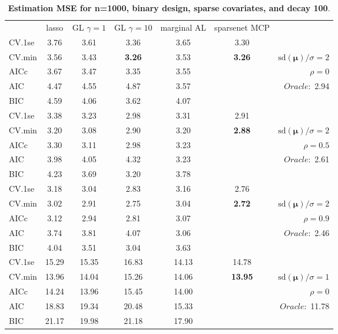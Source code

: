 \begin{table}\vspace{-.5cm}
\caption[l]{ { \bf Estimation MSE for n=1000, binary design, 
sparse covariates, and  decay  100}.}
\vspace{-.5cm}
\footnotesize{}
\begin{center}
\begin{tabular}{l*{5}{c}|r}
& lasso & GL $\gamma=1$ & GL $\gamma=10$ & marginal AL & sparsenet MCP  & \\
 \cline{1-7}
CV.1se & 3.76 & 3.61 & 3.36 & 3.65 & 3.30 & \\
CV.min & 3.56 & 3.43 & {\bf 3.26} & 3.53 & {\bf 3.26} &  $\mathrm{sd}(\mathbf{\mu})/\sigma=2$ \\
AICc & 3.67 & 3.47 & 3.35 & 3.55 & & $\rho=0$ \\
AIC & 4.47 & 4.55 & 4.87 & 3.57 & &  \multirow{2}{*}{$Oracle: $ 2.94} \\
BIC & 4.59 & 4.06 & 3.62 & 4.07 & &  \\
 \hline 
CV.1se & 3.38 & 3.23 & 2.98 & 3.31 & 2.91 & \\
CV.min & 3.20 & 3.08 & 2.90 & 3.20 & {\bf 2.88} &  $\mathrm{sd}(\mathbf{\mu})/\sigma=2$ \\
AICc & 3.30 & 3.11 & 2.98 & 3.23 & & $\rho=0.5$ \\
AIC & 3.98 & 4.05 & 4.32 & 3.23 & &  \multirow{2}{*}{$Oracle: $ 2.61} \\
BIC & 4.23 & 3.69 & 3.20 & 3.78 & &  \\
 \hline 
CV.1se & 3.18 & 3.04 & 2.83 & 3.16 & 2.76 & \\
CV.min & 3.02 & 2.91 & 2.75 & 3.04 & {\bf 2.72} &  $\mathrm{sd}(\mathbf{\mu})/\sigma=2$ \\
AICc & 3.12 & 2.94 & 2.81 & 3.07 & & $\rho=0.9$ \\
AIC & 3.74 & 3.81 & 4.07 & 3.06 & &  \multirow{2}{*}{$Oracle: $ 2.46} \\
BIC & 4.04 & 3.51 & 3.04 & 3.63 & &  \\
 \hline 
CV.1se & 15.29 & 15.35 & 16.83 & 14.13 & 14.78 & \\
CV.min & 13.96 & 14.04 & 15.26 & 14.06 & {\bf 13.95} &  $\mathrm{sd}(\mathbf{\mu})/\sigma=1$ \\
AICc & 14.24 & 13.96 & 15.45 & 14.00 & & $\rho=0$ \\
AIC & 18.83 & 19.34 & 20.48 & 15.33 & &  \multirow{2}{*}{$Oracle: $ 11.78} \\
BIC & 21.17 & 19.98 & 21.18 & 17.90 & &  \\

\end{tabular}
\end{center}
\end{table}

